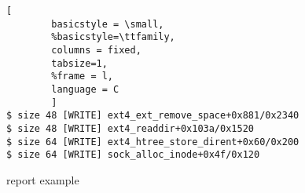 \begin{figure}[t]

        \begin{lstlisting}[
        basicstyle = \small,
        %basicstyle=\ttfamily,
        columns = fixed,
        tabsize=1,
        %frame = l,
        language = C
        ]
$ size 48 [WRITE] ext4_ext_remove_space+0x881/0x2340
$ size 48 [WRITE] ext4_readdir+0x103a/0x1520
$ size 64 [WRITE] ext4_htree_store_dirent+0x60/0x200
$ size 64 [WRITE] sock_alloc_inode+0x4f/0x120
                \end{lstlisting}
        \caption{\dkasan report example}
        \label{fig:dkasan-report}

\end{figure}
